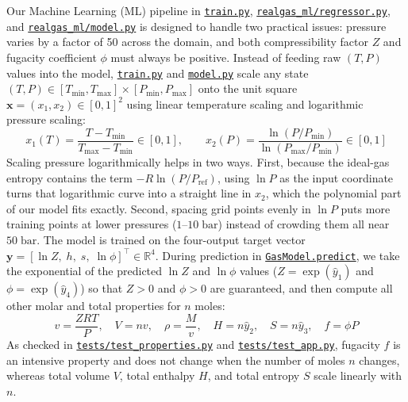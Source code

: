 \documentclass[10pt,a4paper]{article}
\begin{document}
Our Machine Learning (ML) pipeline in \href{https://github.com/satwikgupta122/realgas_ml/blob/main/train.py}{\texttt{train.py}}, \href{https://github.com/satwikgupta122/realgas_ml/blob/main/realgas_ml/regressor.py}{\texttt{realgas\_ml/regressor.py}}, and \href{https://github.com/satwikgupta122/realgas_ml/blob/main/realgas_ml/model.py}{\texttt{realgas\_ml/model.py}} is designed to handle two practical issues: pressure varies by a factor of 50 across the domain, and both compressibility factor $Z$ and fugacity coefficient $\phi$ must always be positive. Instead of feeding raw $(T, P)$ values into the model, \href{https://github.com/satwikgupta122/realgas_ml/blob/main/train.py}{\texttt{train.py}} and \href{https://github.com/satwikgupta122/realgas_ml/blob/main/realgas_ml/model.py}{\texttt{model.py}} scale any state $(T, P) \in [T_{\min}, T_{\max}] \times [P_{\min}, P_{\max}]$ onto the unit square $\mathbf{x} = (x_1, x_2) \in [0, 1]^2$ using linear temperature scaling and logarithmic pressure scaling:
\begin{equation}
x_1(T) = \frac{T - T_{\min}}{T_{\max} - T_{\min}} \in [0, 1], \qquad
x_2(P) = \frac{\ln(P / P_{\min})}{\ln(P_{\max} / P_{\min})} \in [0, 1]
\label{eq:scaling}
\end{equation}
Scaling pressure logarithmically helps in two ways. First, because the ideal-gas entropy contains the term $-R\ln(P/P_{\mathrm{ref}})$, using $\ln P$ as the input coordinate turns that logarithmic curve into a straight line in $x_2$, which the polynomial part of our model fits exactly. Second, spacing grid points evenly in $\ln P$ puts more training points at lower pressures ($1\text{--}10\;\mathrm{bar}$) instead of crowding them all near $50\;\mathrm{bar}$. The model is trained on the four-output target vector $\mathbf{y} = [\ln Z,\; h,\; s,\; \ln\phi]^\top \in \mathbb{R}^4$. During prediction in \href{https://github.com/satwikgupta122/realgas_ml/blob/main/realgas_ml/model.py}{\texttt{GasModel.predict}}, we take the exponential of the predicted $\ln Z$ and $\ln\phi$ values ($Z = \exp(\hat{y}_1)$ and $\phi = \exp(\hat{y}_4)$) so that $Z > 0$ and $\phi > 0$ are guaranteed, and then compute all other molar and total properties for $n$ moles:
\begin{equation}
v = \frac{ZRT}{P}, \quad V = nv, \quad \rho = \frac{M}{v}, \quad H = n\hat{y}_2, \quad S = n\hat{y}_3, \quad f = \phi P
\label{eq:reconstruction}
\end{equation}
As checked in \href{https://github.com/satwikgupta122/realgas_ml/blob/main/tests/test_properties.py}{\texttt{tests/test\_properties.py}} and \href{https://github.com/satwikgupta122/realgas_ml/blob/main/tests/test_app.py}{\texttt{tests/test\_app.py}}, fugacity $f$ is an intensive property and does not change when the number of moles $n$ changes, whereas total volume $V$, total enthalpy $H$, and total entropy $S$ scale linearly with $n$.
\end{document}
